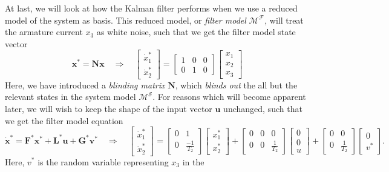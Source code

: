 \documentclass[11pt]{article}
\begin{document}
    At last, we will look at how the Kalman filter performs when we use a
reduced model of the system as basis. This reduced model, or
\emph{filter model} \(\mathcal{M^F}\), will treat the armature current
\(x_3\) as white noise, such that we get the filter model state vector
\[
\mathbf{x}^* = \mathbf{N}\mathbf{x}
\quad \Rightarrow \quad 
\begin{bmatrix}
\dot{x}_1^* \\ \dot{x}_2^*
\end{bmatrix}
=
\begin{bmatrix}
1 & 0 & 0 \\
0 & 1 & 0
\end{bmatrix}
\begin{bmatrix}
x_1 \\ x_2 \\x_3
\end{bmatrix}
\] Here, we have introduced a \emph{blinding matrix} \(\mathbf{N}\),
which \emph{blinds out} the all but the relevant states in the system
model \(\mathcal{M^S}\). For reasons which will become apparent later,
we will wish to keep the shape of the input vector \(\mathbf{u}\)
unchanged, such that we get the filter model equation \[
\dot{\mathbf{x}}^* = \mathbf{F}^* \mathbf{x}^* + \mathbf{L}^* \mathbf{u} + \mathbf{G}^* \mathbf{v}^*
\quad \Rightarrow \quad
\begin{bmatrix}
\dot{x}_1^* \\ \dot{x}_2^*
\end{bmatrix}
=
\begin{bmatrix}
0 & 1 \\
0 & \frac{-1}{T_2}
\end{bmatrix}
\begin{bmatrix}
x_1^* \\ x_2^*
\end{bmatrix}
+
\begin{bmatrix}
0 & 0 & 0 \\
0 & 0 & \frac{1}{T_2}
\end{bmatrix}
\begin{bmatrix}
0 \\ 0 \\ u
\end{bmatrix}
+
\begin{bmatrix}
0 & 0 \\
0 & \frac{1}{T_2}
\end{bmatrix}
\begin{bmatrix}
0 \\ v^*
\end{bmatrix}.
\] Here, \(v^*\) is the random variable representing \(x_3\) in the
\end{document}
